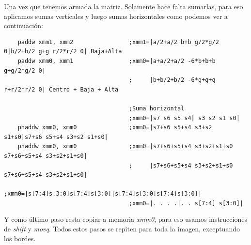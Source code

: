 Una vez que tenemos armada la matriz. Solamente hace falta sumarlas, para eso aplicamos sumas verticales y luego sumas horizontales como podemos ver a continuación:

\begin{codesnippet}
\begin{verbatim}    
    paddw xmm1, xmm2                ;xmm1=|a/2+a/2 b+b g/2*g/2 0|b/2+b/2 g+g r/2*r/2 0| Baja+Alta
    paddw xmm0, xmm1                ;xmm0=|a+a/2+a/2 -6*b+b+b g+g/2*g/2 0| 
                                    ;     |b+b/2+b/2 -6*g+g+g r+r/2*r/2 0| Centro + Baja + Alta	

                                    ;Suma horizontal
                                    ;xmm0=|s7 s6 s5 s4| s3 s2 s1 s0|
    phaddw xmm0, xmm0               ;xmm0=|s7+s6 s5+s4 s3+s2 s1+s0|s7+s6 s5+s4 s3+s2 s1+s0|
    phaddw xmm0, xmm0               ;xmm0=|s7+s6+s5+s4 s3+s2+s1+s0 s7+s6+s5+s4 s3+s2+s1+s0|
                                    ;     |s7+s6+s5+s4 s3+s2+s1+s0 s7+s6+s5+s4 s3+s2+s1+s0|  
                                    ;xmm0=|s[7:4]s[3:0]s[7:4]s[3:0]|s[7:4]s[3:0]s[7:4]s[3:0]|
                                    ;xmm0=|. . . .|. . s[7:4] s[3:0]|
\end{verbatim}
\end{codesnippet}

Y como último paso resta copiar a memoria \emph{xmm0}, para eso usamos instrucciones de \emph{shift} y \emph{movq}. Todos estos pasos se repiten para toda la imagen, exceptuando los bordes.